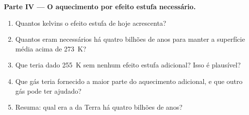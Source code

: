 \begin{problem}
\medskip
\noindent\textbf{Parte IV --- O aquecimento por efeito estufa necessário.}
\begin{enumerate}[resume]
  \item Quantos kelvins o efeito estufa de hoje acrescenta?
  \item Quantos eram necessários há quatro bilhões de anos para manter a
        superfície média acima de \qty{273}{K}?
  \item Que  teria dado \qty{255}{K} sem nenhum efeito estufa
        adicional? Isso é plausível?
  \item Que gás teria fornecido a maior parte do aquecimento adicional, e
        que outro gás pode ter ajudado?
  \item Resuma: qual era a  da Terra há quatro
        bilhões de anos?
\end{enumerate}
\end{problem}
